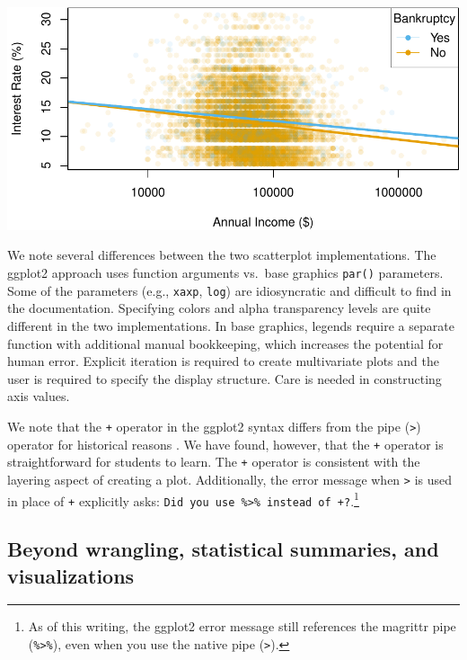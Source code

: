\documentclass[12pt]{article}
\begin{document}
\begin{center}\includegraphics[width=0.8\linewidth]{educators-perspective-tidyverse_files/figure-latex/base-scat-1} \end{center}

\label{base-scat} \linespread{2}
\vspace{3mm}\setlength{\parindent}{15pt}

We note several differences between the two scatterplot implementations.
The ggplot2 approach uses function arguments vs.~base graphics
\texttt{par()} parameters. Some of the parameters (e.g., \texttt{xaxp},
\texttt{log}) are idiosyncratic and difficult to find in the
documentation. Specifying colors and alpha transparency levels are quite
different in the two implementations. In base graphics, legends require
a separate function with additional manual bookkeeping, which increases
the potential for human error. Explicit iteration is required to create
multivariate plots and the user is required to specify the display
structure. Care is needed in constructing axis values.

We note that the \texttt{+} operator in the ggplot2 syntax differs from
the pipe (\texttt{\textbar{}\textgreater{}}) operator for historical
reasons \citep{wickham2015pipe}. We have found, however, that the
\texttt{+} operator is straightforward for students to learn. The
\texttt{+} operator is consistent with the layering aspect of creating a
plot. Additionally, the error message when
\texttt{\textbar{}\textgreater{}} is used in place of \texttt{+}
explicitly asks:
\texttt{Did\ you\ use\ \%\textgreater{}\%\ instead\ of\ +?}.\footnote{As
  of this writing, the ggplot2 error message still references the
  magrittr pipe (\texttt{\%\textgreater{}\%}), even when you use the
  native pipe (\texttt{\textbar{}\textgreater{}}).}

\hypertarget{sec:extra}{%
\subsection{Beyond wrangling, statistical summaries, and
visualizations}\label{sec:extra}}
\end{document}

